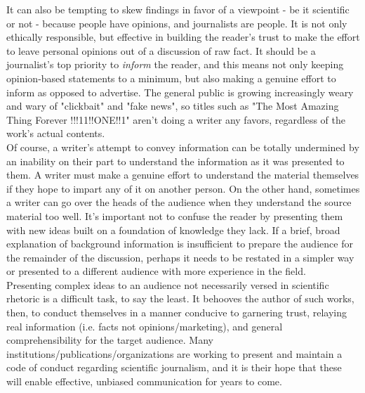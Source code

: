 \documentclass[12pt]{article}
\begin{document}
\indent It can also be tempting to skew findings in favor of a viewpoint - be it scientific or not - because people have opinions, and journalists are people. It is not only ethically responsible, but effective in building the reader's trust to make the effort to leave personal opinions out of a discussion of raw fact. It should be a journalist's top priority to \emph{inform} the reader, and this means not only keeping opinion-based statements to a minimum, but also making a genuine effort to inform as opposed to advertise. The general public is growing increasingly weary and wary of "clickbait" and "fake news", so titles such as "The Most Amazing Thing Forever !!!11!!ONE!!1" aren't doing a writer any favors, regardless of the work's actual contents.\\
\indent Of course, a writer's attempt to convey information can be totally undermined by an inability on their part to understand the information as it was presented to them. A writer must make a genuine effort to understand the material themselves if they hope to impart any of it on another person. On the other hand, sometimes a writer can go over the heads of the audience when they understand the source material too well. It's important not to confuse the reader by presenting them with new ideas built on a foundation of knowledge they lack. If a brief, broad explanation of background information is insufficient to prepare the audience for the remainder of the discussion, perhaps it needs to be restated in a simpler way or presented to a different audience with more experience in the field.\\
\indent Presenting complex ideas to an audience not necessarily versed in scientific rhetoric is a difficult task, to say the least. It behooves the author of such works, then, to conduct themselves in a manner conducive to garnering trust, relaying real information (i.e. facts not opinions/marketing), and general comprehensibility for the target audience. Many institutions/publications/organizations are working to present and maintain a code of conduct regarding scientific journalism, and it is their hope that these will enable effective, unbiased communication for years to come.
\end{document}
